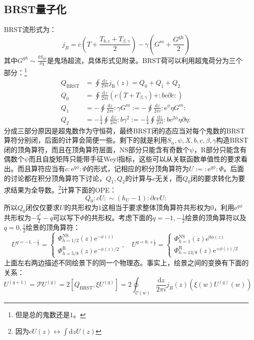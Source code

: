 \subsection{BRST量子化}
BRST流形式为：
\begin{equation}
	j_B=c\left(T+\frac{T_{b,c}+T_{\beta,\gamma}}{2}\right)-\gamma\left(G^m+\frac{G^{\mathrm{gh}}}{2}\right)
\end{equation}
其中$G^{gh}\sim\frac{\delta S_{gh}}{\delta\chi}$是鬼场超流，具体形式见附录。BRST荷可以利用超鬼荷分为三个部分：\footnote{但是总的鬼数还是$1$。}
\begin{equation}
	\begin{aligned}
		Q_{\mathrm{BRST}}&=\oint\frac{\mathrm{d}z}{2\pi i}j_{\mathrm{B}}(z)=Q_0+Q_1+Q_2\\Q_{0}&=\oint\frac{\mathrm{d}z}{2\pi i}\left(c(T+T_{\beta,\gamma})+:bc\partial c:\right)\\Q_{1}&=-\oint\frac{\mathrm{d}z}{2\pi i}:\gamma G^m:=-\oint\frac{\mathrm{d}z}{2\pi i}:\mathrm{e}^\phi\eta G^m:\\Q_{2}&=-\frac{1}{4}\oint\frac{\mathrm{d}z}{2\pi i}:b\gamma^2:=-\frac{1}{4}\oint\frac{\mathrm{d}z}{2\pi i}:b\mathrm{e}^{2\phi}\eta\partial\eta:
	\end{aligned}
\end{equation}
分成三部分原因是超鬼数作为守恒荷，最终BRST闭的态应当对每个鬼数的BRST算符分别闭，后面的计算会简便一些。剩下的就是利用$S_\alpha,\psi,X,b,c,\beta,\gamma$构造BRST闭的顶角算符，而且在顶角算符层面，NS部分只能含有奇数个$\psi$，R部分只能含有偶数个$\psi$而且自旋矩阵只能带手征Weyl指标，这些可以从关联函数单值性的要求看出。而且算符应当有$c:\mathrm{e}^{q\phi}:\Phi$的形式，记相应的积分顶角算符为$U:=:\mathrm{e}^{q\phi}:\Phi$。后面的讨论都在积分顶角算符下讨论，$Q_1,Q_2$的计算与$c$无关，而$Q_0$闭的要求转化为要求结果为全导数。\footnote{因为$cU(z)\leftrightarrow\int \mathrm{d}z U(z)$}计算下面的OPE：
\begin{equation}
	Q_0:cU: \sim (h_U-1):\partial c c U:
\end{equation}
所以$Q_0$闭仅仅要求$U$的共形权为$1$这相当于要求整体顶角算符共形权为$0$，利用$\mathrm{e}^{q\phi}$共形权为$-\frac{q^2}{2}-q$可以写下$\Phi$的共形权。考虑下面的$q=-1,-\frac12$绘景的顶角算符以及$q=0,\frac12$绘景的顶角算符：
\begin{equation}
	U^{q=-1,-\frac12} = \begin{cases}
		\Phi_{h=1/2}^{\mathrm{NS}}(z)\mathrm{e}^{-\phi(z)}\\
		\Phi_{h=5/8}^{\mathrm{R}}(z)\mathrm{e}^{-\phi(z)/2}
	\end{cases},\quad 
	U^{q=0,+\frac12} = \begin{cases}
		\Phi_{h=1}^{\mathrm{NS}}(z)\mathrm{e}^{0\phi(z)}\\
		\Phi_{h=13/8}^{\mathrm{R}}(z)\mathrm{e}^{+\phi(z)/2}
	\end{cases}
\end{equation}
上面左右两边描述不同绘景下的同一个物理态。事实上，绘景之间的变换有下面的关系：
\begin{equation}
	\label{eq:PCO}
	U^{(q+1)}=\mathcal{P}U^{(q)}=2[Q_{\mathrm{BRST}},\xi U^{(q)}]=2\oint_{\mathcal{C}(w)}\frac{\mathrm{d}z}{2\pi i }j_B(z)\left(\xi(w)U^{(q)}(w)\right)
\end{equation}

